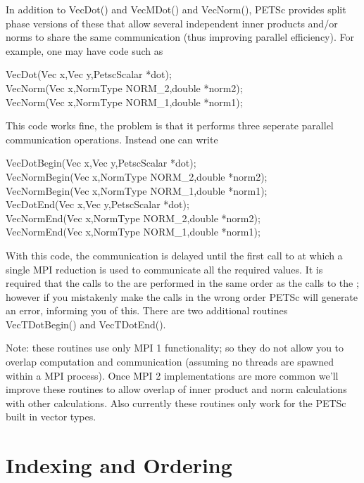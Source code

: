 In addition to VecDot() and VecMDot() and VecNorm(), PETSc provides
split phase versions of these that allow several independent inner products and/or norms
to share the same communication (thus improving parallel efficiency). For example,
one may have code such as 
\begin{tabbing}
 VecDot(Vec x,Vec y,PetscScalar *dot);\\
 VecNorm(Vec x,NormType NORM\_2,double *norm2);\\
 VecNorm(Vec x,NormType NORM\_1,double *norm1);
\end{tabbing}
This code works fine, the problem is that it performs three seperate parallel communication
operations. Instead one can write 
\begin{tabbing}
 VecDotBegin(Vec x,Vec y,PetscScalar *dot);\\
 VecNormBegin(Vec x,NormType NORM\_2,double *norm2);\\
 VecNormBegin(Vec x,NormType NORM\_1,double *norm1);\\
 VecDotEnd(Vec x,Vec y,PetscScalar *dot);\\
 VecNormEnd(Vec x,NormType NORM\_2,double *norm2);\\
 VecNormEnd(Vec x,NormType NORM\_1,double *norm1);
\end{tabbing}
With this code,    
the  communication is delayed until the first call to 
 at which 
a single MPI reduction is used to communicate all the required values. It is required that the
calls to the  are performed in the same order as the calls to the 
; however if you mistakenly make the calls in the wrong order PETSc
will generate an error,
informing you of this. There are two additional routines VecTDotBegin() and 
VecTDotEnd().  

Note: these routines use only MPI 1 functionality; so they do not allow you to overlap 
computation and communication (assuming no threads are spawned within a MPI process). 
Once MPI 2 implementations are more common we'll improve these
routines to allow overlap of inner product and norm calculations with other calculations.
Also currently these routines only work for the PETSc built in vector types.

\section{Indexing and Ordering}
\label{sec_indexingandordering}

